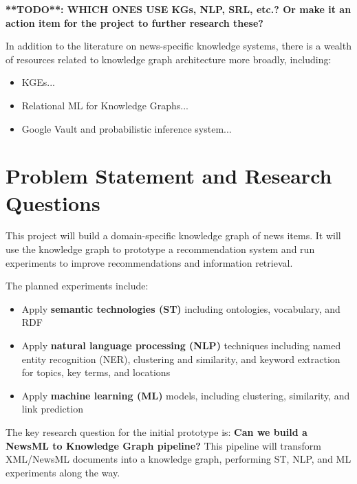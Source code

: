 \documentclass[11pt]{article}   	%
\begin{document}
\textbf{**TODO**: WHICH ONES USE KGs, NLP, SRL, etc.? Or make it an action item for the project to further research these?}

In addition to the literature on news-specific knowledge systems, there is a wealth of resources related to knowledge graph architecture more broadly, including:

\begin{itemize}
\item KGEs...\cite{wang2017knowledge}
\item Relational ML for Knowledge Graphs...\cite{nickel2015review}
\item Google Vault and probabilistic inference system...\cite{45634}
\end{itemize}

\newpage
\section{Problem Statement and Research Questions}

This project will build a domain-specific knowledge graph of news items. It will use the knowledge graph to prototype a recommendation system and run experiments to improve recommendations and information retrieval.

The planned experiments include:

\begin{itemize}
\item Apply \textbf{semantic technologies (ST)} including ontologies, vocabulary, and RDF
\item Apply \textbf{natural language processing (NLP)} techniques including named entity recognition (NER), clustering and similarity, and keyword extraction for topics, key terms, and locations
\item Apply \textbf{machine learning (ML)} models, including clustering, similarity, and link prediction
\end{itemize}

The key research question for the initial prototype is: \textbf{Can we build a NewsML to Knowledge Graph pipeline?} This pipeline will transform XML/NewsML documents into a knowledge graph, performing ST, NLP, and ML experiments along the way.
\end{document}
